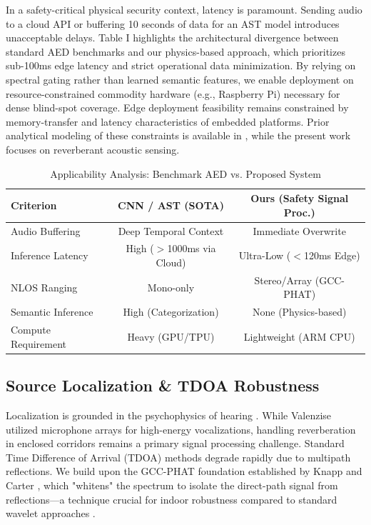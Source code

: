 \documentclass[conference]{IEEEtran}
\begin{document}
In a safety-critical physical security context, latency is paramount. Sending audio to a cloud API or buffering 10 seconds of data for an AST model introduces unacceptable delays. Table I highlights the architectural divergence between standard AED benchmarks and our physics-based approach, which prioritizes sub-100ms edge latency and strict operational data minimization. By relying on spectral gating rather than learned semantic features, we enable deployment on resource-constrained commodity hardware (e.g., Raspberry Pi) necessary for dense blind-spot coverage. Edge deployment feasibility remains constrained by memory-transfer and latency characteristics of embedded platforms. Prior analytical modeling of these constraints is available in \cite{b27}, while the present work focuses on reverberant acoustic sensing.

\begin{table}[htbp]
\caption{Applicability Analysis: Benchmark AED vs. Proposed System}
\begin{center}
\begin{tabular}{lcc}
\toprule
\textbf{Criterion} & \textbf{CNN / AST (SOTA)} & \textbf{Ours (Safety Signal Proc.)} \\
\midrule
Audio Buffering & Deep Temporal Context & Immediate Overwrite \\
Inference Latency & High ($>$1000ms via Cloud) & Ultra-Low ($<$120ms Edge) \\
NLOS Ranging & Mono-only & Stereo/Array (GCC-PHAT) \\
Semantic Inference & High (Categorization) & None (Physics-based) \\
Compute Requirement & Heavy (GPU/TPU) & Lightweight (ARM CPU) \\
\bottomrule
\end{tabular}
\end{center}
\label{tab:comparison}
\end{table}

\subsection{Source Localization \& TDOA Robustness}
Localization is grounded in the psychophysics of hearing \cite{b9}. While Valenzise \cite{b5} utilized microphone arrays for high-energy vocalizations, handling reverberation in enclosed corridors remains a primary signal processing challenge. Standard Time Difference of Arrival (TDOA) methods degrade rapidly due to multipath reflections. We build upon the GCC-PHAT foundation established by Knapp and Carter \cite{b20}, which "whitens" the spectrum to isolate the direct-path signal from reflections—a technique crucial for indoor robustness compared to standard wavelet approaches \cite{b10}.
\end{document}
